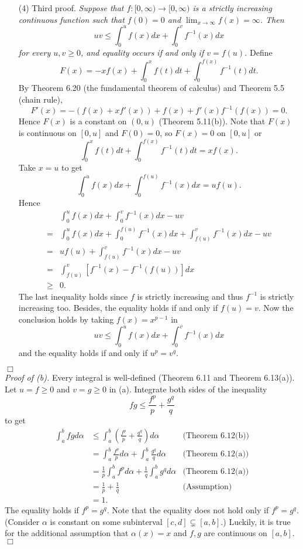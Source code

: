 \documentclass{article}
\begin{document}
\begin{enumerate}
  \item[(4)]
  Third proof.
  \emph{Suppose that $f:[0,\infty) \to [0,\infty)$ is a strictly increasing continuous function
  such that $f(0) = 0$ and $\lim_{x \to \infty} f(x) = \infty$.
  Then
  \[
    uv \leq \int_{0}^{u} f(x)dx + \int_{0}^{v} f^{-1}(x)dx
  \]
  for every $u,v \geq 0$, and equality occurs if and only if $v = f(u)$.}
  Define
  \[
    F(x) = -xf(x) + \int_{0}^{x} f(t)dt + \int_{0}^{f(x)} f^{-1}(t)dt.
  \]
  By Theorem 6.20 (the fundamental theorem of calculus) and Theorem 5.5 (chain rule),
  \[
    F'(x) = -(f(x) + xf'(x))+ f(x) + f'(x) f^{-1}(f(x)) = 0.
  \]
  Hence $F(x)$ is a constant on $(0,u)$ (Theorem 5.11(b)).
  Note that $F(x)$ is continuous on $[0,u]$ and $F(0) = 0$,
  so $F(x) = 0$ on $[0,u]$
  or
  \[
    \int_{0}^{x} f(t)dt + \int_{0}^{f(x)} f^{-1}(t)dt = xf(x).
  \]
  Take $x = u$ to get
  \[
    \int_{0}^{u} f(x)dx + \int_{0}^{f(u)} f^{-1}(x)dx = uf(u).
  \]
  Hence
  \begin{align*}
    &\int_{0}^{u} f(x)dx + \int_{0}^{v} f^{-1}(x)dx - uv \\
    =&
    \int_{0}^{u} f(x)dx + \int_{0}^{f(u)} f^{-1}(x)dx + \int_{f(u)}^{v} f^{-1}(x)dx - uv \\
    =&
    uf(u) + \int_{f(u)}^{v} f^{-1}(x)dx - uv \\
    =&
    \int_{f(u)}^{v} [ f^{-1}(x)-f^{-1}(f(u)) ] dx \\
    \geq&
    0.
  \end{align*}
  The last inequality holds since $f$ is strictly increasing
  and thus $f^{-1}$ is strictly increasing too.
  Besides, the equality holds if and only if $f(u) = v$.
  Now the conclusion holds by taking $f(x) = x^{p-1}$ in
  \[
    uv \leq \int_{0}^{u} f(x)dx + \int_{0}^{v} f^{-1}(x)dx
  \]
  and the equality holds if and only if $u^p = v^q$.
\end{enumerate}
$\Box$ \\



\emph{Proof of (b).}
Every integral is well-defined (Theorem 6.11 and Theorem 6.13(a)).
Let $u = f \geq 0$ and $v = g \geq 0$ in (a).
Integrate both sides of the inequality
\[
  fg \leq \frac{f^p}{p} + \frac{g^q}{q}
\]
to get
\begin{align*}
  \int_{a}^{b} fg d\alpha
  &\leq \int_{a}^{b} \left( \frac{f^p}{p} + \frac{g^q}{q} \right) d\alpha
    &\text{(Theorem 6.12(b))} \\
  &= \int_{a}^{b} \frac{f^p}{p} d\alpha + \int_{a}^{b} \frac{g^q}{q} d\alpha
    &\text{(Theorem 6.12(a))} \\
  &= \frac{1}{p} \int_{a}^{b} f^p d\alpha + \frac{1}{q} \int_{a}^{b} g^q d\alpha
    &\text{(Theorem 6.12(a))} \\
  &= \frac{1}{p} + \frac{1}{q}
    &\text{(Assumption)} \\
  &= 1.
\end{align*}
The equality holds if $f^p = g^q$.
Note that the equality does not hold only if $f^p = g^q$.
(Consider $\alpha$ is constant on some subinterval $[c,d] \subsetneq [a,b]$.)
Luckily, it is true for the additional assumption that
$\alpha(x) = x$ and $f, g$ are continuous on $[a,b]$.
$\Box$ \\
\end{document}
